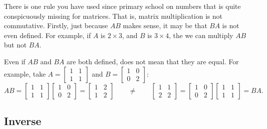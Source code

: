 There is one rule you have used since primary school on numbers
that is quite conspicuously missing for matrices.
That is, matrix multiplication is
not commutative.  Firstly, just because $AB$ makes sense, it may be
that $BA$ is not even defined.  For example, if $A$ is $2 \times 3$, and
$B$ is $3 \times 4$, the we can multiply $AB$ but not $BA$.

Even if $AB$ and $BA$ are both defined, does not mean that they are equal.
For example, take
$A = \left[ \begin{smallmatrix} 1 & 1 \\ 1 & 1 \end{smallmatrix} \right]$
and
$B = \left[ \begin{smallmatrix} 1 & 0 \\ 0 & 2 \end{smallmatrix} \right]$:
\begin{equation*}
AB = 
\begin{bmatrix} 1 & 1 \\ 1 & 1 \end{bmatrix}
\begin{bmatrix} 1 & 0 \\ 0 & 2 \end{bmatrix}
=
\begin{bmatrix} 1 & 2 \\ 1 & 2 \end{bmatrix}
\qquad
\not=
\qquad
\begin{bmatrix} 1 & 1 \\ 2 & 2 \end{bmatrix}
=
\begin{bmatrix} 1 & 0 \\ 0 & 2 \end{bmatrix}
\begin{bmatrix} 1 & 1 \\ 1 & 1 \end{bmatrix}
=
BA .
\end{equation*}

\subsection{Inverse}


